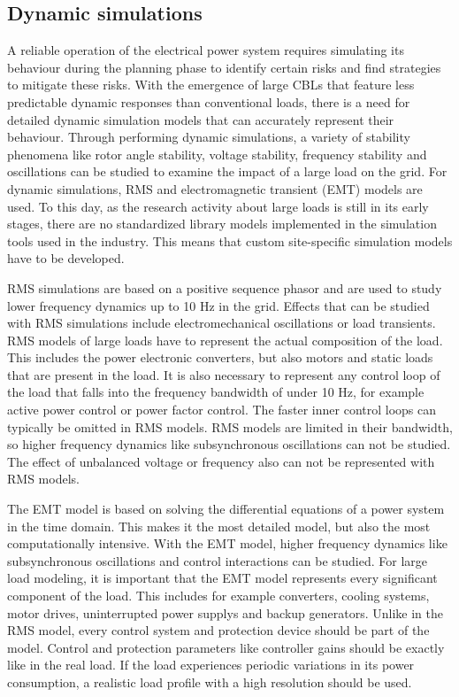 \documentclass[conference]{IEEEtran}
\begin{document}
\subsection{Dynamic simulations}
A reliable operation of the electrical power system requires simulating its behaviour during the planning phase to identify certain risks and find strategies to mitigate these risks. With the emergence of large CBLs that feature less predictable dynamic responses than conventional loads, there is a need for detailed dynamic simulation models that can accurately represent their behaviour. Through performing dynamic simulations, a variety of stability phenomena like rotor angle stability, voltage stability, frequency stability and oscillations can be studied to examine the impact of a large load on the grid. For dynamic simulations, RMS and electromagnetic transient (EMT) models are used. To this day, as the research activity about large loads is still in its early stages, there are no standardized library models implemented in the simulation tools used in the industry. This means that custom site-specific simulation models have to be developed.\cite{modeling}

RMS simulations are based on a positive sequence phasor and are used to study lower frequency dynamics up to 10 Hz in the grid. Effects that can be studied with RMS simulations include electromechanical oscillations or load transients. RMS models of large loads have to represent the actual composition of the load. This includes the power electronic converters, but also motors and static loads that are present in the load. It is also necessary to represent any control loop of the load that falls into the frequency bandwidth of under 10 Hz, for example active power control or power factor control. The faster inner control loops can typically be omitted in RMS models. RMS models are limited in their bandwidth, so higher frequency dynamics like subsynchronous oscillations can not be studied. The effect of unbalanced voltage or frequency also can not be represented with RMS models.\cite{modeling}

The EMT model is based on solving the differential equations of a power system in the time domain. This makes it the most detailed model, but also the most computationally intensive. With the EMT model, higher frequency dynamics like subsynchronous oscillations and control interactions can be studied. For large load modeling, it is important that the EMT model represents every significant component of the load. This includes for example converters, cooling systems, motor drives, uninterrupted power supplys and backup generators. Unlike in the RMS model, every control system and protection device should be part of the model. Control and protection parameters like controller gains should be exactly like in the real load. If the load experiences periodic variations in its power consumption, a realistic load profile with a high resolution should be used.\cite{modeling}
\end{document}
